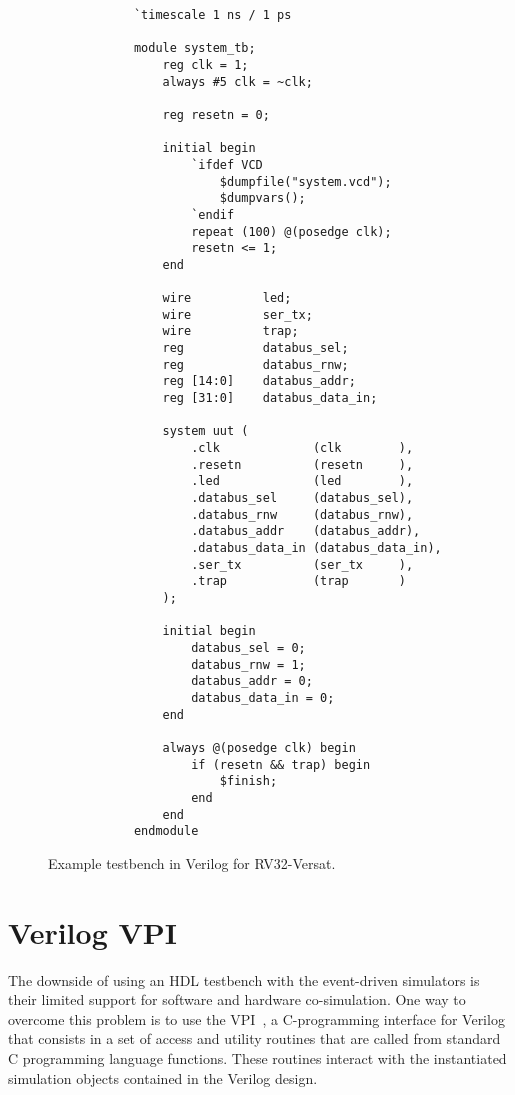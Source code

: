 \lstset{language=verilog}
\begin{figure}[!htb]
	\begin{minipage}{\linewidth}
		\begin{spacing}{0.7}
			\begin{lstlisting}
			`timescale 1 ns / 1 ps
			
			module system_tb;
				reg clk = 1;
				always #5 clk = ~clk;
				
				reg resetn = 0;
				
				initial begin
					`ifdef VCD
						$dumpfile("system.vcd");
						$dumpvars();
					`endif
					repeat (100) @(posedge clk);
					resetn <= 1;
				end
				
				wire          led;
				wire          ser_tx;
				wire          trap;
				reg           databus_sel;
				reg           databus_rnw;
				reg [14:0]    databus_addr;
				reg [31:0]    databus_data_in;
				
				system uut (
					.clk             (clk        ),
					.resetn          (resetn     ),
					.led             (led        ),
					.databus_sel     (databus_sel),
					.databus_rnw     (databus_rnw),
					.databus_addr    (databus_addr),
					.databus_data_in (databus_data_in),
					.ser_tx          (ser_tx     ),
					.trap            (trap       )
				);
				
				initial begin
					databus_sel = 0;
					databus_rnw = 1;
					databus_addr = 0;
					databus_data_in = 0;
				end
				
				always @(posedge clk) begin
					if (resetn && trap) begin
						$finish;
					end
				end
			endmodule
			\end{lstlisting}
		\end{spacing}
	\end{minipage}
	\vspace*{-10mm}
	\caption{Example testbench in Verilog for RV32-Versat.}
	\label{fig:tb_verilog}
\end{figure}

\section{Verilog VPI}
\label{section:vpi}

The downside of using an HDL testbench with the event-driven simulators is their
limited support for software and hardware co-simulation. One way to overcome
this problem is to use the \ac{VPI}~\cite{vpi}, a C-programming interface for
Verilog that consists in a set of access and utility routines that are called
from standard C programming language functions. These routines interact with the
instantiated simulation objects contained in the Verilog design.

